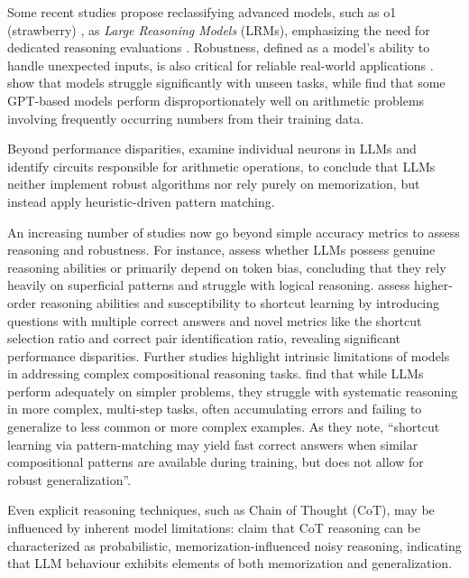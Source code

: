 Some recent studies propose reclassifying advanced models, such as o1 (strawberry) \citep{openai2024o1}, as \textit{Large Reasoning Models} (LRMs), emphasizing the need for dedicated reasoning evaluations \citep{valmeekam2024llmscantplanlrms}. Robustness, defined as a model's ability to handle unexpected inputs, is also critical for reliable real-world applications \citep{wang2023robustnesschatgptadversarialoutofdistribution, wang2022measureimproverobustnessnlp}. \citet{embers2024} show that models struggle significantly with unseen tasks, while \citet{razeghi-etal-2022-impact} find that some GPT-based models perform disproportionately well on arithmetic problems involving frequently occurring numbers from their training data.

Beyond performance disparities, \citep{nikankin2024arithmeticalgorithmslanguagemodels} examine individual neurons in LLMs and identify circuits responsible for arithmetic operations, to conclude that LLMs neither implement robust algorithms nor rely purely on memorization, but instead apply heuristic-driven pattern matching. 

An increasing number of studies now go beyond simple accuracy metrics to assess reasoning and robustness. For instance, \citep{jiang2024peektokenbiaslarge} assess whether LLMs possess genuine reasoning abilities or primarily depend on token bias, concluding that they rely heavily on superficial patterns and struggle with logical reasoning. \citep{taghanaki2024mmluproevaluatinghigherorderreasoning} assess higher-order reasoning abilities and susceptibility to shortcut learning by introducing questions with multiple correct answers and novel metrics like the shortcut selection ratio and correct pair identification ratio, revealing significant performance disparities. Further studies highlight intrinsic limitations of models in addressing complex compositional reasoning tasks. \citet{faithandfate} find that while LLMs perform adequately on simpler problems, they struggle with systematic reasoning in more complex, multi-step tasks, often accumulating errors and failing to generalize to less common or more complex examples. As they note, ``shortcut learning via pattern-matching may yield fast correct answers when similar compositional patterns are available during training, but does not allow for robust generalization''. 

Even explicit reasoning techniques, such as Chain of Thought (CoT), may be influenced by inherent model limitations: \citet{prabhakar2024decipheringfactorsinfluencingefficacy} claim that CoT reasoning can be characterized as probabilistic, memorization-influenced noisy reasoning, indicating that LLM behaviour exhibits elements of both memorization and generalization.

